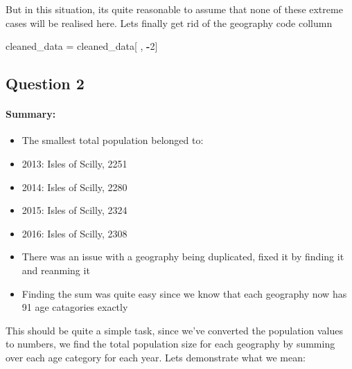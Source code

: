 \documentclass[]{article}
\newenvironment{Shaded}{\begin{snugshade}}{\end{snugshade}}
\newcommand{\KeywordTok}[1]{\textcolor[rgb]{0.13,0.29,0.53}{\textbf{#1}}}
\newcommand{\DecValTok}[1]{\textcolor[rgb]{0.00,0.00,0.81}{#1}}
\newcommand{\StringTok}[1]{\textcolor[rgb]{0.31,0.60,0.02}{#1}}
\newcommand{\CommentTok}[1]{\textcolor[rgb]{0.56,0.35,0.01}{\textit{#1}}}
\newcommand{\OperatorTok}[1]{\textcolor[rgb]{0.81,0.36,0.00}{\textbf{#1}}}
\newcommand{\NormalTok}[1]{#1}
\providecommand{\tightlist}{%
  \setlength{\itemsep}{0pt}\setlength{\parskip}{0pt}}
\let\oldparagraph\paragraph
\renewcommand{\paragraph}[1]{\oldparagraph{#1}\mbox{}}
\begin{document}
But in this situation, its quite reasonable to assume that none of these
extreme cases will be realised here. Lets finally get rid of the
geography code collumn

\begin{Shaded}
\begin{Highlighting}[]
\NormalTok{cleaned_data =}\StringTok{ }\NormalTok{cleaned_data[ , }\OperatorTok{-}\DecValTok{2}\NormalTok{]}
\end{Highlighting}
\end{Shaded}

\subsection{Question 2}\label{question-2}

\paragraph{Summary:}\label{summary-1}

\begin{itemize}
\tightlist
\item
  The smallest total population belonged to:
\item
  2013: Isles of Scilly, 2251
\item
  2014: Isles of Scilly, 2280
\item
  2015: Isles of Scilly, 2324
\item
  2016: Isles of Scilly, 2308
\item
  There was an issue with a geography being duplicated, fixed it by
  finding it and reanming it
\item
  Finding the sum was quite easy since we know that each geography now
  has 91 age catagories exactly
\end{itemize}

This should be quite a simple task, since we've converted the population
values to numbers, we find the total population size for each geography
by summing over each age category for each year. Lets demonstrate what
we mean:

\begin{Shaded}
\end{Shaded}
\end{document}

